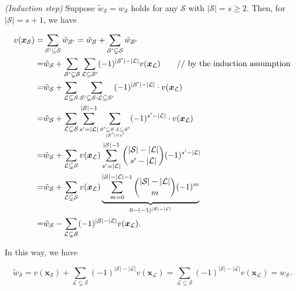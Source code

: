 \textit{(Induction step)} Suppose {\small$\tilde{w}_{\mathcal{S}} = w_{\mathcal{S}} $} holds for any {\small$\mathcal{S}$} with {\small$|\mathcal{S}|=s\geq 2$}. 
Then, for {\small$|\mathcal{S}|=s+1$}, we have

\begin{small}
\begin{align*}
 v(\boldsymbol{x}_{\mathcal{S}})  =& \sum_{\mathcal{S}'\subseteq \mathcal{S}} \tilde{w}_{\mathcal{S}'}  =  \tilde{w}_{\mathcal{S}}  + \sum_{\mathcal{S}'\subsetneq \mathcal{S}} \tilde{w}_{\mathcal{S}'} \\
=&  \tilde{w}_{\mathcal{S}}  + \sum_{\mathcal{S}'\subsetneq \mathcal{S}}\sum_{\mathcal{L}\subseteq \mathcal{S}'}(-1)^{|\mathcal{S}'|-|\mathcal{L}|} v(\boldsymbol{x}_{\mathcal{L}}) \qquad\text{// by the induction assumption}\\
=&  \tilde{w}_{\mathcal{S}}  + \sum_{\mathcal{L}\subsetneq \mathcal{S}}\sum_{\mathcal{S}'\subsetneq \mathcal{S}:\mathcal{L}\subseteq \mathcal{S}'} (-1)^{|\mathcal{S}'|-|\mathcal{L}|}\cdot  v(\boldsymbol{x}_{\mathcal{L}}) \\
=&  \tilde{w}_{\mathcal{S}}  + \sum_{\mathcal{L}\subsetneq \mathcal{S}}\sum_{s'=|\mathcal{L}|}^{|\mathcal{S}|-1}\sum_{\scriptsize\substack{\mathcal{S}'\subsetneq \mathcal{S}: \mathcal{L}\subseteq \mathcal{S}'\\|\mathcal{S}'|=s'}} (-1)^{s'-|\mathcal{L}|}\cdot  v(\boldsymbol{x}_{\mathcal{L}}) \\
=&  \tilde{w}_{\mathcal{S}}  + \sum_{\mathcal{L}\subsetneq \mathcal{S}}  v(\boldsymbol{x}_{\mathcal{L}})  \sum_{s'=|\mathcal{L}|}^{|\mathcal{S}|-1} \binom{|\mathcal{S}|-|\mathcal{L}|}{s'-|\mathcal{L}|} (-1)^{s'-|\mathcal{L}|}\\
=&  \tilde{w}_{\mathcal{S}}  + \sum_{\mathcal{L}\subsetneq \mathcal{S}}  v(\boldsymbol{x}_{\mathcal{L}})  \underbrace{\sum_{m=0}^{|\mathcal{S}|-|\mathcal{L}|-1} \binom{|\mathcal{S}|-|\mathcal{L}|}{m} (-1)^{m}}_{0-(-1)^{|\mathcal{S}|-|\mathcal{L}|}}\\
=&  \tilde{w}_{\mathcal{S}}  - \sum_{\mathcal{L}\subsetneq \mathcal{S}}(-1)^{|\mathcal{S}|-|\mathcal{L}|}  v(\boldsymbol{x}_{\mathcal{L}}) .
\end{align*}
\end{small}

In this way, we have 
\begin{small}
\begin{equation*}
     \tilde{w}_{\mathcal{S}}  =  v(\boldsymbol{x}_{\mathcal{S}})  + \sum_{\mathcal{L}\subsetneq \mathcal{S}}(-1)^{|\mathcal{S}|-|\mathcal{L}|}  v(\boldsymbol{x}_{\mathcal{L}})  = \sum_{\mathcal{L}\subseteq \mathcal{S}}(-1)^{|\mathcal{S}|-|\mathcal{L}|} v(\boldsymbol{x}_{\mathcal{L}})  =  w_{\mathcal{S}} .
\end{equation*}
\end{small}

